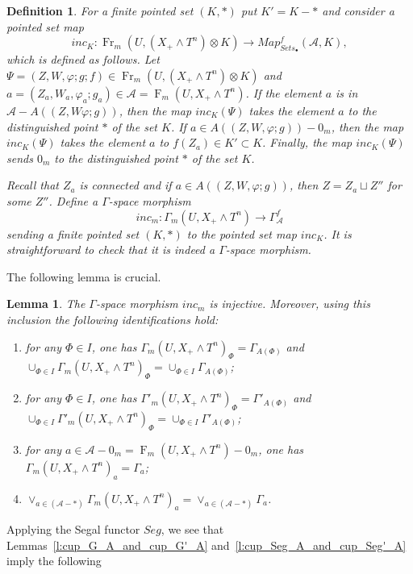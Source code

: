 \documentclass[a4paper,11pt,reqno]{amsart}
\newtheorem{lemma}[theorem]{Lemma}
\newtheorem{definition}[theorem]{Definition}
\begin{document}
\begin{definition}{\rm
For a finite pointed set $(K,*)$ put $K'=K-*$ and consider a pointed
set map
   $$inc_{K}: {\operatorname{Fr}}_m(U,(X_+\wedge T^n)\otimes K)\to Map^f_{Sets_{\bullet}}(\mathcal A,K),$$
which is defined as follows. Let $\Psi=(Z,W,{\varphi};g;f)\in
{\operatorname{Fr}}_m(U,(X_+\wedge T^n)\otimes K)$ and $a=(Z_a,W_a,{\varphi}_a;g_a)\in
\mathcal A={\operatorname{F}}_m(U,X_+\wedge T^n)$. If the element $a$ is in
$\mathcal A-A((Z,W{\varphi};g))$, then the map $inc_{K}(\Psi)$ takes the
element $a$ to the distinguished point $*$ of the set $K$. If $a\in
A((Z,W,{\varphi};g))-0_m$, then the map $inc_{K}(\Psi)$ takes the element
$a$ to $f(Z_a)\in K'\subset K$. Finally, the map $inc_{K}(\Psi)$
sends $0_m$ to the distinguished point $*$ of the set $K$.

Recall that $Z_a$ is connected and if $a\in A((Z,W,{\varphi};g))$, then
$Z=Z_a\sqcup Z''$ for some $Z''$. Define a $\Gamma$-space morphism
$$inc_m: \Gamma_m(U,X_+\wedge T^n)\to \Gamma^f_{\mathcal A}$$
sending a finite pointed set $(K,*)$ to the pointed set map
$inc_{K}$. It is straightforward to check that it is indeed a
$\Gamma$-space morphism.

}\end{definition}

The following lemma is crucial.

\begin{lemma}\label{l:key}
The $\Gamma$-space morphism $inc_m$ is injective. Moreover, using
this inclusion the following identifications hold:

\begin{enumerate}
\item for any $\Phi\in I$, one has $\Gamma_m(U,X_+\wedge
T^n)_{\Phi}=\Gamma_{A(\Phi)}$ and $\cup_{\Phi\in
I}\Gamma_m(U,X_+\wedge T^n)_{\Phi}= \cup_{\Phi\in I}\Gamma_{A(\Phi)}$;
\item for any $\Phi\in I$, one has $\Gamma'_m(U,X_+\wedge
T^n)_{\Phi}=\Gamma'_{A(\Phi)}$ and $\cup_{\Phi\in
I}\Gamma'_m(U,X_+\wedge T^n)_{\Phi}=\cup_{\Phi\in
I}\Gamma'_{A(\Phi)}$;
\item for any $a\in \mathcal A-0_m={\operatorname{F}}_m(U,X_+\wedge T^n)-0_m$, one has $\Gamma_m(U,X_+\wedge T^n)_a=\Gamma_a$;
\item $\vee_{a\in (\mathcal A-*)}\Gamma_m(U,X_+\wedge T^n)_a=\vee_{a\in (\mathcal A-*)}\Gamma_a$.
\end{enumerate}
\end{lemma}

Applying the Segal functor $Seg$, we see that
Lemmas~\ref{l:cup_G_A_and_cup_G'_A}
and~\ref{l:cup_Seg_A_and_cup_Seg'_A} imply the following
\end{document}
